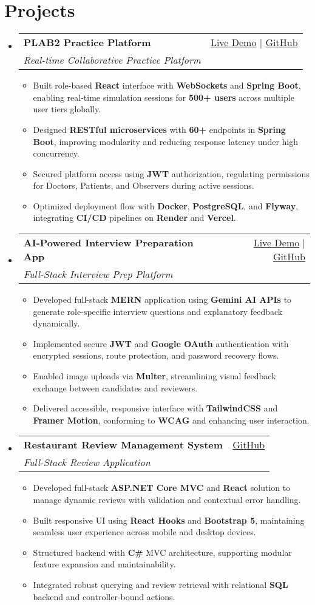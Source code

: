 \documentclass[letterpaper,10pt]{article}
\makeatletter
\newcommand{\resumeItem}[1]{\item\small{#1 \vspace{-2pt}}}
\newcommand{\resumeSubheading}[4]{
  \vspace{-1pt}\item
    \begin{tabular*}{0.97\textwidth}[t]{l@{\extracolsep{\fill}}r}
      \textbf{#1} & #2 \\
      \textit{\small#3} & \textit{\small #4} \\
    \end{tabular*}\vspace{-5pt}
}
\newcommand{\resumeSubHeadingListStart}{\begin{itemize}[leftmargin=*]}
\newcommand{\resumeSubHeadingListEnd}{\end{itemize}}
\newcommand{\resumeItemListStart}{\begin{itemize}}
\newcommand{\resumeItemListEnd}{\end{itemize}\vspace{-5pt}}
\makeatother
\begin{document}
\section{Projects}
  \resumeSubHeadingListStart
    \resumeSubheading
      {\textbf{PLAB2 Practice Platform}}{\href{https://plab2practice.com}{Live Demo} | \href{https://github.com/altansaid/plab2projectnew}{GitHub}}
      {Real-time Collaborative Practice Platform}{}
      \resumeItemListStart
        \resumeItem{Built role-based \textbf{React} interface with \textbf{WebSockets} and \textbf{Spring Boot}, enabling real-time simulation sessions for \textbf{500+ users} across multiple user tiers globally.}
        \resumeItem{Designed \textbf{RESTful microservices} with \textbf{60+} endpoints in \textbf{Spring Boot}, improving modularity and reducing response latency under high concurrency.}
        \resumeItem{Secured platform access using \textbf{JWT} authorization, regulating permissions for Doctors, Patients, and Observers during active sessions.}
        \resumeItem{Optimized deployment flow with \textbf{Docker}, \textbf{PostgreSQL}, and \textbf{Flyway}, integrating \textbf{CI/CD} pipelines on \textbf{Render} and \textbf{Vercel}.}
      \resumeItemListEnd

    \resumeSubheading
      {\textbf{AI-Powered Interview Preparation App}}{\href{https://interviewcoach-ai.vercel.app}{Live Demo} | \href{https://github.com/altansaid/interviewcoach-ai}{GitHub}}
      {Full-Stack Interview Prep Platform}{}
      \resumeItemListStart
        \resumeItem{Developed full-stack \textbf{MERN} application using \textbf{Gemini AI APIs} to generate role-specific interview questions and explanatory feedback dynamically.}
        \resumeItem{Implemented secure \textbf{JWT} and \textbf{Google OAuth} authentication with encrypted sessions, route protection, and password recovery flows.}
        \resumeItem{Enabled image uploads via \textbf{Multer}, streamlining visual feedback exchange between candidates and reviewers.}
        \resumeItem{Delivered accessible, responsive interface with \textbf{TailwindCSS} and \textbf{Framer Motion}, conforming to \textbf{WCAG} and enhancing user interaction.}
      \resumeItemListEnd

    \resumeSubheading
      {\textbf{Restaurant Review Management System}}{\href{https://github.com/altansaid/restaurantreviewmanagementsystem}{GitHub}}{Full-Stack Review Application}{}
      \resumeItemListStart
        \resumeItem{Developed full-stack \textbf{ASP.NET Core MVC} and \textbf{React} solution to manage dynamic reviews with validation and contextual error handling.}
        \resumeItem{Built responsive UI using \textbf{React Hooks} and \textbf{Bootstrap 5}, maintaining seamless user experience across mobile and desktop devices.}
        \resumeItem{Structured backend with \textbf{C\#} MVC architecture, supporting modular feature expansion and maintainability.}
        \resumeItem{Integrated robust querying and review retrieval with relational \textbf{SQL} backend and controller-bound actions.}
      \resumeItemListEnd
  \resumeSubHeadingListEnd
\end{document}
